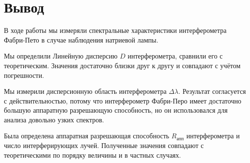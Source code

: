 \documentclass[a4paper,12pt]{article} %
\begin{document}
    \newpage

    \section{Вывод}

    В ходе работы мы измеряли спектральные характеристики интерферометра Фабри-Пето в случае наблюдения натриевой лампы.

    Мы определили Линейную дисперсию $D$ интерферометра, сравнили его с теоретическим. Значения достаточно близки друг к другу и совпадают с учётом погрешности.

    Мы измерили дисперсионную область интерферометра $\Delta\lambda$. Результат согласуется с действительностью, потому что интерферометр Фабри-Перо имеет достаточно большую аппаратную разрешающую способность, но он использовался для анализа довольно узких спектров.

    Была определена аппаратная разрешающая способность $R_{\text{апп}}$ интерферометра и число интерферирующих лучей. Полученные значения совпадают с теоретическими по порядку величины и в частных случаях.
\end{document}
